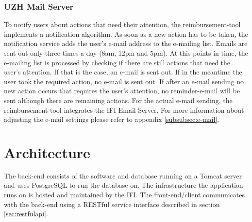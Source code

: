 \subsubsection{UZH Mail Server}
To notify users about actions that need their attention, the reimbursement-tool implements a notification algorithm. As soon as a new action has to be taken, the notification service adds the user's e-mail address to the e-mailing list. Emails are sent out only three times a day (8am, 12pm and 5pm). At this points in time, the e-mailing list is processed by checking if there are still actions that need the user's attention. If that is the case, an e-mail is sent out. If in the meantime the user took the required action, no e-mail is sent out. If after an e-mail sending no new action occurs that requires the user's attention, no reminder-e-mail will be sent although there are remaining actions. For the actual e-mail sending, the reimbursement-tool integrates the IFI Email Server. For more information about adjusting the e-mail settings please refer to appendix \ref{subsubsec:e-mail}.

\newpage


\section{Architecture}

The back-end consists of the software and database running on a Tomcat \cite{tomcat} server and uses PostgreSQL \cite{postgresql} to run the database on. The infrastructure the application runs on is hosted and maintained by the IFI. The front-end/client communicates with the back-end using a RESTful service interface described in section \ref{sec:restfulapi}.

